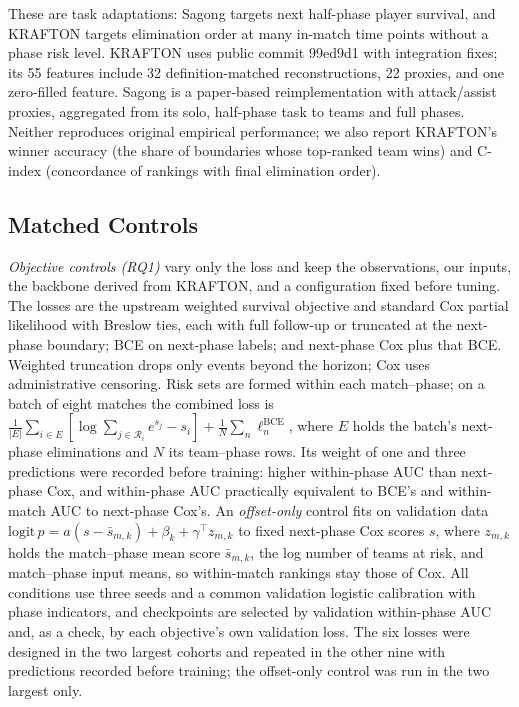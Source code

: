 \documentclass[sigconf,anonymous,nonacm]{acmart}
\begin{document}
These are task adaptations: Sagong targets next half-phase player survival, and KRAFTON targets elimination order at many in-match time points without a phase risk level. KRAFTON uses public commit 99ed9d1 with integration fixes; its 55 features include 32 definition-matched reconstructions, 22 proxies, and one zero-filled feature. Sagong is a paper-based reimplementation with attack/assist proxies, aggregated from its solo, half-phase task to teams and full phases. Neither reproduces original empirical performance; we also report KRAFTON's winner accuracy (the share of boundaries whose top-ranked team wins) and C-index (concordance of rankings with final elimination order).


\subsection{Matched Controls}
\label{sec:method:decomposition}
\emph{Objective controls (RQ1)} vary only the loss and keep the observations, our inputs, the backbone derived from KRAFTON, and a configuration fixed before tuning. The losses are the upstream weighted survival objective and standard Cox partial likelihood with Breslow ties, each with full follow-up or truncated at the next-phase boundary; BCE on next-phase labels; and next-phase Cox plus that BCE. Weighted truncation drops only events beyond the horizon; Cox uses administrative censoring. Risk sets are formed within each match--phase; on a batch of eight matches the combined loss is $\frac{1}{|E|}\sum_{i\in E}[\log\sum_{j\in\mathcal{R}_i}e^{s_j}-s_i]+\frac{1}{N}\sum_{n}\ell^{\mathrm{BCE}}_n$, where $E$ holds the batch's next-phase eliminations and $N$ its team--phase rows. Its weight of one and three predictions were recorded before training: higher within-phase AUC than next-phase Cox, and within-phase AUC practically equivalent to BCE's and within-match AUC to next-phase Cox's. An \emph{offset-only} control fits on validation data $\mathrm{logit}\,p=a(s-\bar s_{m,k})+\beta_k+\gamma^{\top}z_{m,k}$ to fixed next-phase Cox scores $s$, where $z_{m,k}$ holds the match--phase mean score $\bar s_{m,k}$, the log number of teams at risk, and match--phase input means, so within-match rankings stay those of Cox. All conditions use three seeds and a common validation logistic calibration with phase indicators, and checkpoints are selected by validation within-phase AUC and, as a check, by each objective's own validation loss. The six losses were designed in the two largest cohorts and repeated in the other nine with predictions recorded before training; the offset-only control was run in the two largest only.
\end{document}
